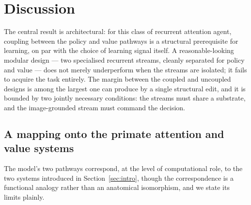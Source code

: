 \section{Discussion}
\label{sec:discussion}

The central result is architectural: for this class of recurrent attention agent,
coupling between the policy and value pathways is a structural prerequisite for
learning, on par with the choice of learning signal itself. A reasonable-looking
modular design --- two specialised recurrent streams, cleanly separated for policy
and value --- does not merely underperform when the streams are isolated; it fails to
acquire the task entirely. The margin between the coupled and uncoupled designs is
among the largest one can produce by a single structural edit, and it is bounded by
two jointly necessary conditions: the streams must share a substrate, and the
image-grounded stream must command the decision.

\subsection{A mapping onto the primate attention and value systems}
The model's two pathways correspond, at the level of computational role, to the two
systems introduced in Section~\ref{sec:intro}, though the correspondence is a
functional analogy rather than an anatomical isomorphism, and we state its limits
plainly.

